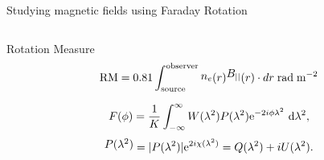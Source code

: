 \documentclass[xetex,aspectratio=169]{beamer}
\newcommand{\mypos}[2]{\tikz[remember picture]{\node[inner sep=0pt, anchor=base](#2){#1};}}
\begin{document}
	\begin{frame}{Studying magnetic fields using Faraday Rotation}
		\begin{columns}
			
			\begin{column}{0.55\textwidth}
				
				
				
				\begin{block}{Rotation Measure}
					\begin{equation*}
						\mypos{\text{RM}}{rm} = 0.81 \int_{\text{source}}^{\text{observer}} \mypos{$n_e$}{ne}(r) \mypos{$B_{||}$}{be}(r) \cdot dr\; \text{rad}\;\text{m}^{-2}
					\end{equation*}
				\end{block}
				
				\begin{equation*}
					F(\phi) = \frac{1}{K} \int_{-\infty}^{\infty}{ W(\lambda^2)P(\lambda^2){\rm e}^{-2i\phi \lambda^2}~{\rm d}\lambda^2 },
				\end{equation*}
				\begin{equation*}
					\mypos{$P(\lambda^2)$}{ppos} = |P(\lambda^2)|{\rm e}^{2i\chi(\lambda^2)} = Q(\lambda^2) + iU(\lambda^2).
				\end{equation*}
			\end{column}
			

\end{columns}
\end{frame}
\end{document}
